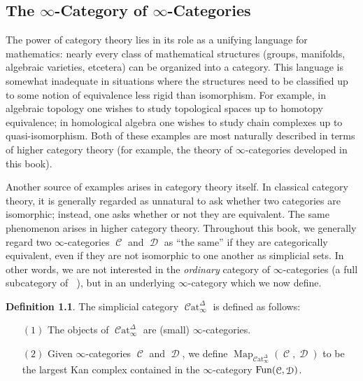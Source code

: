 \documentclass{report}[10pt, final]
\DeclareMathOperator{\bHom}{{Map}}
\DeclareMathOperator{\sSet}{\mathcal{S}et_{\Delta}}
\DeclareMathOperator{\Cat}{\mathcal{C}at}
\DeclareMathOperator{\calC}{\mathcal{C}}
\DeclareMathOperator{\calD}{\mathcal{D}}
\theoremstyle{definition}
\newtheorem{definition}[theorem]{Definition}
\begin{document}
\begin{chapter2onwards}
\chapter{The $\infty$-Category of $\infty$-Categories}\label{chap4}

\setcounter{theorem}{0}
\setcounter{subsection}{0}


The power of category theory lies in its role as a unifying language for mathematics: nearly every class of mathematical structures (groups, manifolds, algebraic varieties, etcetera) can be organized into a category. This language is somewhat inadequate in situations where the 
structures need to be classified up to some notion of equivalence less rigid than isomorphism. For example, in algebraic topology one wishes to study topological spaces up to homotopy equivalence; in homological algebra one wishes to study chain complexes up to quasi-isomorphism. Both of these examples are most naturally described in terms of higher category theory (for example, the theory of $\infty$-categories developed in this book).

Another source of examples arises in category theory itself. In classical category theory, it is generally regarded as unnatural to ask whether two categories are isomorphic; instead, one asks whether or not they are equivalent. The same phenomenon arises in higher category theory. Throughout this book, we generally regard two $\infty$-categories $\calC$ and $\calD$ as ``the same'' if they are categorically equivalent, even if they are not isomorphic to one another as simplicial sets. In other words, we are not interested in the {\em ordinary} category of $\infty$-categories (a full subcategory of $\sSet$), but in an underlying $\infty$-category which we now define.

\begin{definition}\index{not}{CatinftyD@$\Cat_{\infty}^{\Delta}$}\index{not}{Catinfty@$\Cat_{\infty}$}
The simplicial category $\Cat_{\infty}^{\Delta}$ is defined as follows:
\begin{itemize}
\item[$(1)$] The objects of $\Cat_{\infty}^{\Delta}$ are (small) $\infty$-categories.

\item[$(2)$] Given $\infty$-categories $\calC$ and $\calD$, we define $\bHom_{\Cat_{\infty}^{\Delta}}(\calC,\calD)$ to be the largest Kan complex contained in the $\infty$-category $\Fun(\calC, \calD)$.
\end{itemize}


\end{definition}
\end{chapter2onwards}
\end{document}
